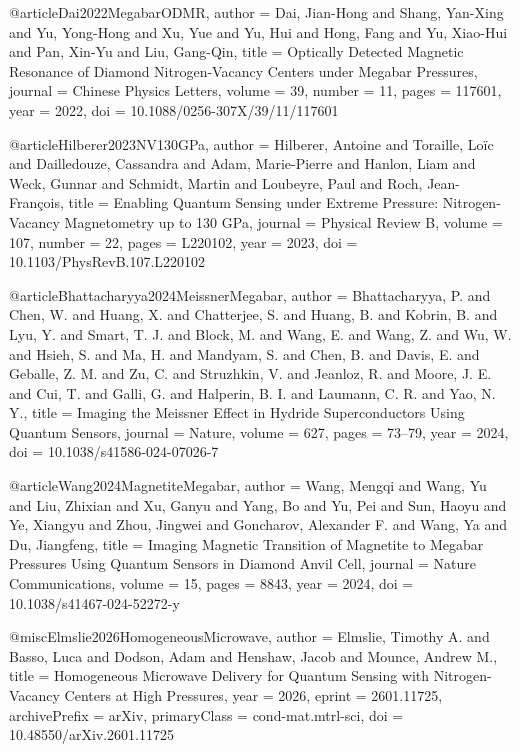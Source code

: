 
@article{Dai2022MegabarODMR,
  author  = {Dai, Jian-Hong and Shang, Yan-Xing and Yu, Yong-Hong and Xu, Yue and Yu, Hui and Hong, Fang and Yu, Xiao-Hui and Pan, Xin-Yu and Liu, Gang-Qin},
  title   = {Optically Detected Magnetic Resonance of Diamond Nitrogen-Vacancy Centers under Megabar Pressures},
  journal = {Chinese Physics Letters},
  volume  = {39},
  number  = {11},
  pages   = {117601},
  year    = {2022},
  doi     = {10.1088/0256-307X/39/11/117601}
}

@article{Hilberer2023NV130GPa,
  author  = {Hilberer, Antoine and Toraille, Lo{\"i}c and Dailledouze, Cassandra and Adam, Marie-Pierre and Hanlon, Liam and Weck, Gunnar and Schmidt, Martin and Loubeyre, Paul and Roch, Jean-Fran{\c{c}}ois},
  title   = {Enabling Quantum Sensing under Extreme Pressure: Nitrogen-Vacancy Magnetometry up to 130 {GPa}},
  journal = {Physical Review B},
  volume  = {107},
  number  = {22},
  pages   = {L220102},
  year    = {2023},
  doi     = {10.1103/PhysRevB.107.L220102}
}

@article{Bhattacharyya2024MeissnerMegabar,
  author  = {Bhattacharyya, P. and Chen, W. and Huang, X. and Chatterjee, S. and Huang, B. and Kobrin, B. and Lyu, Y. and Smart, T. J. and Block, M. and Wang, E. and Wang, Z. and Wu, W. and Hsieh, S. and Ma, H. and Mandyam, S. and Chen, B. and Davis, E. and Geballe, Z. M. and Zu, C. and Struzhkin, V. and Jeanloz, R. and Moore, J. E. and Cui, T. and Galli, G. and Halperin, B. I. and Laumann, C. R. and Yao, N. Y.},
  title   = {Imaging the Meissner Effect in Hydride Superconductors Using Quantum Sensors},
  journal = {Nature},
  volume  = {627},
  pages   = {73--79},
  year    = {2024},
  doi     = {10.1038/s41586-024-07026-7}
}

@article{Wang2024MagnetiteMegabar,
  author  = {Wang, Mengqi and Wang, Yu and Liu, Zhixian and Xu, Ganyu and Yang, Bo and Yu, Pei and Sun, Haoyu and Ye, Xiangyu and Zhou, Jingwei and Goncharov, Alexander F. and Wang, Ya and Du, Jiangfeng},
  title   = {Imaging Magnetic Transition of Magnetite to Megabar Pressures Using Quantum Sensors in Diamond Anvil Cell},
  journal = {Nature Communications},
  volume  = {15},
  pages   = {8843},
  year    = {2024},
  doi     = {10.1038/s41467-024-52272-y}
}


@misc{Elmslie2026HomogeneousMicrowave,
  author        = {Elmslie, Timothy A. and Basso, Luca and Dodson, Adam and Henshaw, Jacob and Mounce, Andrew M.},
  title         = {Homogeneous Microwave Delivery for Quantum Sensing with Nitrogen-Vacancy Centers at High Pressures},
  year          = {2026},
  eprint        = {2601.11725},
  archivePrefix = {arXiv},
  primaryClass  = {cond-mat.mtrl-sci},
  doi           = {10.48550/arXiv.2601.11725}
}
